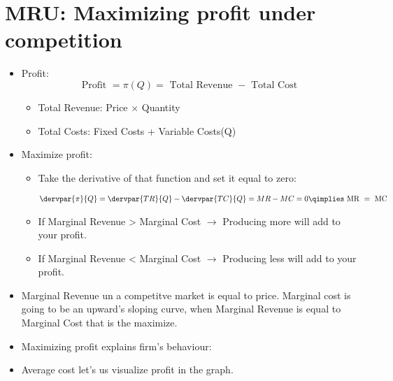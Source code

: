 \documentclass{article}
\begin{document}
\section{MRU: Maximizing profit under competition}
\begin{itemize}
    \item Profit: 
        \[
          \text{ Profit } = \pi(Q) = \text{ Total Revenue } - \text{ Total Cost }
        \]
        \begin{itemize}
            \item Total Revenue: Price $\times $ Quantity 
            \item Total Costs:  Fixed Costs + Variable Costs(Q) 
        \end{itemize}
    
    \item Maximize profit: 
        \begin{itemize}
            \item Take the derivative of that function and set it equal to zero:
                \begin{center}
                   \begin{align*}
                       \dervpar{\pi }{Q} = \dervpar{TR}{Q} - \dervpar{TC}{Q} = MR-MC = 0 \qimplies \text{ MR } = \text{ MC } \\ 
                   \end{align*}
                \end{center}
            
            \item If Marginal Revenue > Marginal Cost $\rightarrow$ Producing more will add to your profit. 
            \item If Marginal Revenue < Marginal Cost $\rightarrow$ Producing less will add to your profit.
        \end{itemize}
    
    \item Marginal Revenue un a competitve market is equal to price. Marginal cost is going to be an upward's sloping curve, when Marginal Revenue is equal to Marginal Cost that is the maximize. 
    \item Maximizing profit explains firm's behaviour: 
    
    \item Average cost let's us visualize profit in the graph. 
\end{itemize}
\end{document}

